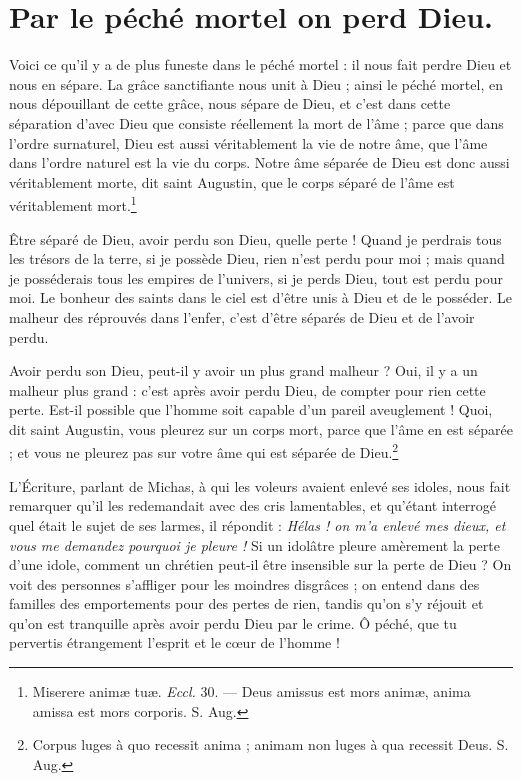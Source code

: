\documentclass[instructions.tex]{subfiles}
\begin{document}
\chapter{Par le péché mortel on perd Dieu.}

\primo
Voici ce qu’il y a de plus funeste dans le péché mortel : il nous fait perdre Dieu et nous en sépare. La grâce sanctifiante nous unit à Dieu ; ainsi le péché mortel, en nous dépouillant de cette grâce, nous sépare de Dieu, et c’est dans cette séparation d’avec Dieu que consiste réellement la mort de l’âme ; parce que dans l’ordre surnaturel, Dieu est aussi véritablement la vie de notre âme, que l’âme dans l’ordre naturel est la vie du corps. Notre âme séparée de Dieu est donc aussi véritablement morte, dit saint Augustin, que le corps séparé de l’âme est véritablement mort.\footnote{Miserere animæ tuæ. \textit{Eccl.} 30. — Deus amissus est mors animæ, anima amissa est mors corporis. S. Aug.}

\secundo
Être séparé de Dieu, avoir perdu son Dieu, quelle perte ! Quand je perdrais tous les trésors de la terre, si je possède Dieu, rien n’est perdu pour moi ; mais quand je posséderais tous les empires de l’univers, si je perds Dieu, tout est perdu pour moi. Le bonheur des saints dans le ciel est d’être unis à Dieu et de le posséder. Le malheur des réprouvés dans l’enfer, c’est d’être séparés de Dieu et de l’avoir perdu.

Avoir perdu son Dieu, peut-il y avoir un plus grand malheur ? Oui, il y a un malheur plus grand : c’est après avoir perdu Dieu, de compter pour rien cette perte. Est-il possible que l’homme soit capable d’un pareil aveuglement ! Quoi, dit saint Augustin, vous pleurez sur un corps mort, parce que l’âme en est séparée ; et vous ne pleurez pas sur votre âme qui est séparée de Dieu.\footnote{Corpus luges à quo recessit anima ; animam non luges à qua recessit Deus. S. Aug.}

L’Écriture, parlant de Michas, à qui les voleurs avaient enlevé ses idoles, nous fait remarquer qu’il les redemandait avec des cris lamentables, et qu’étant interrogé quel était le sujet de ses larmes, il répondit : \textit{Hélas ! on m’a enlevé mes dieux, et vous me demandez pourquoi je pleure !} Si un idolâtre pleure amèrement la perte d’une idole, comment un chrétien peut-il être insensible sur la perte de Dieu ? On voit des personnes s’affliger pour les moindres disgrâces ; on entend dans des familles des emportements pour des pertes de rien, tandis qu’on s’y réjouit et qu’on est tranquille après avoir perdu Dieu par le crime. Ô péché, que tu pervertis étrangement l’esprit et le cœur de l’homme !
\end{document}
